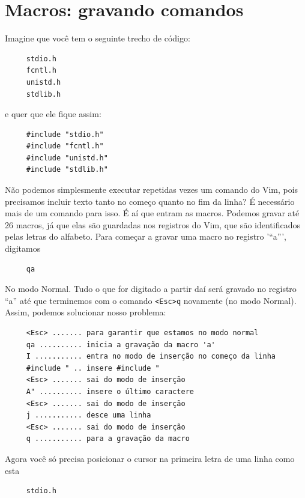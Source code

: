 \documentclass[10pt,a4paper,openany]{book}
\begin{document}
\section{Macros: gravando comandos}\label{Macros: gravando comandos}

Imagine que você tem o seguinte trecho de código:

\begin{verbatim}
     stdio.h
     fcntl.h
     unistd.h
     stdlib.h
\end{verbatim}

e quer que ele fique assim:

\begin{verbatim}
     #include "stdio.h"
     #include "fcntl.h"
     #include "unistd.h"
     #include "stdlib.h"
\end{verbatim}

Não podemos simplesmente executar repetidas vezes um comando do Vim, pois
precisamos incluir texto tanto no começo quanto no fim da linha?  É necessário
mais de um comando para isso.  É aí que entram as macros. Podemos gravar até 26
macros, já que elas são guardadas nos registros do Vim, que são identificados
pelas letras do alfabeto. Para começar a gravar uma macro no registro '``a''',
digitamos

\begin{verbatim}
     qa
\end{verbatim}

No modo Normal. Tudo o que for digitado a partir daí será gravado no
registro ``a'' até que terminemos com o comando
\verb|<Esc>q| novamente (no modo Normal). Assim,
podemos solucionar nosso problema:

\begin{verbatim}
     <Esc> ....... para garantir que estamos no modo normal
     qa .......... inicia a gravação da macro 'a'
     I ........... entra no modo de inserção no começo da linha
     #include " .. insere #include "
     <Esc> ....... sai do modo de inserção
     A" .......... insere o último caractere
     <Esc> ....... sai do modo de inserção
     j ........... desce uma linha
     <Esc> ....... sai do modo de inserção
     q ........... para a gravação da macro
\end{verbatim}

Agora você só precisa posicionar o cursor na primeira letra de uma linha como esta

\begin{verbatim}
     stdio.h
\end{verbatim}
\end{document}
